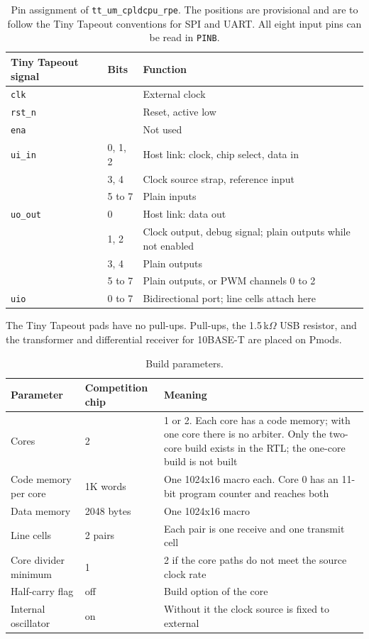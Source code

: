 \documentclass[10pt,a4paper]{article}
\newcommand{\reg}[1]{\texttt{#1}}
\begin{document}
\begin{table}[H]
\centering\small
\begin{tabularx}{\linewidth}{@{}llL@{}}
\toprule
Tiny Tapeout signal & Bits & Function \\
\midrule
\texttt{clk} & & External clock \\
\texttt{rst\_n} & & Reset, active low \\
\texttt{ena} & & Not used \\
\texttt{ui\_in} & 0, 1, 2 & Host link: clock, chip select, data in \\
 & 3, 4 & Clock source strap, reference input \\
 & 5 to 7 & Plain inputs \\
\texttt{uo\_out} & 0 & Host link: data out \\
 & 1, 2 & Clock output, debug signal; plain outputs while not enabled \\
 & 3, 4 & Plain outputs \\
 & 5 to 7 & Plain outputs, or PWM channels 0 to 2 \\
\texttt{uio} & 0 to 7 & Bidirectional port; line cells attach here \\
\bottomrule
\end{tabularx}
\caption{Pin assignment of \texttt{tt\_um\_cpldcpu\_rpe}. The positions are provisional and are to follow the Tiny Tapeout conventions for SPI and
UART. All eight input pins can be read in \reg{PINB}.}
\end{table}

The Tiny Tapeout pads have no pull-ups. Pull-ups, the 1.5\,k$\Omega$ USB resistor, and the transformer and
differential receiver for 10BASE-T are placed on Pmods.

\begin{table}[H]
\centering\small
\begin{tabularx}{\linewidth}{@{}llL@{}}
\toprule
Parameter & Competition chip & Meaning \\
\midrule
Cores & 2 & 1 or 2. Each core has a code memory; with one core there is no arbiter. Only the two-core build exists in the RTL; the one-core build is not built \\
Code memory per core & 1K words & One 1024x16 macro each. Core 0 has an 11-bit program counter and reaches both \\
Data memory & 2048 bytes & One 1024x16 macro \\
Line cells & 2 pairs & Each pair is one receive and one transmit cell \\
Core divider minimum & 1 & 2 if the core paths do not meet the source clock rate \\
Half-carry flag & off & Build option of the core \\
Internal oscillator & on & Without it the clock source is fixed to external \\
\bottomrule
\end{tabularx}
\caption{Build parameters.}
\end{table}
\end{document}
